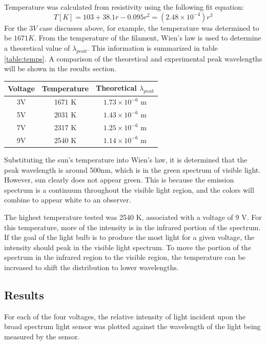 \documentclass[a4paper]{article}
\begin{document}
Temperature was calculated from resistivity using the following fit equation:
$$T[K] = 103 + 38.1r - 0.095r^2 = (2.48\times 10^{-4}) r^3$$
For the $3V$ case discusses above, for example, the temperature was determined to be $1671K$. From the temperature of the filament, Wien's law is used to determine a theoretical value of $\lambda_{peak}$. This information is summarized in table \ref{table:temps}. A comparison of the theoretical and experimental peak wavelengths will be shown in the results section.

\begin{center}
\begin{tabular}{|c|c|c|}
\hline 
Voltage & Temperature & Theoretical $\lambda_{peak}$ \topVspace \bottomVspace \\
\hline
3V & 1671 K & $1.73 \times 10^{-6}$ m \\
5V & 2031 K & $1.43 \times 10^{-6}$ m\\
7V & 2317 K & $1.25 \times 10^{-6}$ m\\
9V & 2540 K & $1.14 \times 10^{-6}$ m\\
\hline
\end{tabular}
\label{table:temps}
\end{center}

\qq Substituting the sun's temperature into Wien's law, it is determined that the peak wavelength is around 500nm, which is in the green spectrum of visible light. However, sun clearly does not appear green. This is because the emission spectrum is a continuum throughout the visible light region, and the colors will combine to appear white to an observer. 

\qq The highest temperature tested was 2540 K, associated with a voltage of 9 V. For this temperature, more of the intensity is in the infrared portion of the spectrum. If the goal of the light bulb is to produce the most light for a given voltage, the intensity should peak in the visible light spectrum. To move the portion of the spectrum in the infrared region to the visible region, the temperature can be increased to shift the distribution to lower wavelengths.

\subsection{Results}

\qq For each of the four voltages, the relative intensity of light incident upon
the broad spectrum light sensor was plotted against the wavelength of the light
being measured by the sensor.
\end{document}
